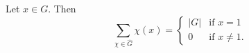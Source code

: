 Let $x \in G$. Then
$$\sum_{\chi \in \widehat{G}} \chi(x) = \begin{cases} |G| & \text{if } x = 1 \\ 0 & \text{if } x \neq 1. \end{cases}$$
